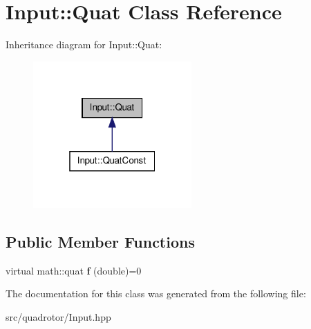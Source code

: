 \hypertarget{classInput_1_1Quat}{\section{\-Input\-:\-:\-Quat \-Class \-Reference}
\label{classInput_1_1Quat}
}


\-Inheritance diagram for \-Input\-:\-:\-Quat\-:\nopagebreak
\begin{figure}[H]
\begin{center}
\leavevmode
\includegraphics[width=172pt]{classInput_1_1Quat__inherit__graph}
\end{center}
\end{figure}
\subsection*{\-Public \-Member \-Functions}
\begin{DoxyCompactItemize}
\item 
\hypertarget{classInput_1_1Quat_a49bc92df827442db4de31b80928b4b86}{virtual math\-::quat {\bfseries f} (double)=0}\label{classInput_1_1Quat_a49bc92df827442db4de31b80928b4b86}

\end{DoxyCompactItemize}


\-The documentation for this class was generated from the following file\-:\begin{DoxyCompactItemize}
\item 
src/quadrotor/\-Input.\-hpp\end{DoxyCompactItemize}
